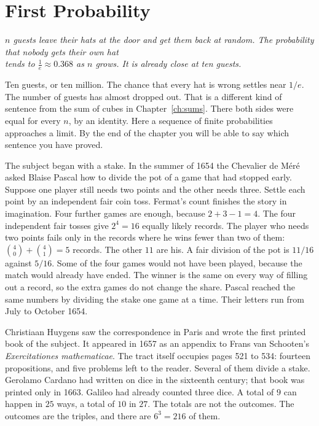 \chapter{First Probability}\label{ch:probability}

\begin{center}\itshape
$n$ guests leave their hats at the door and get them back at random. The probability that nobody gets their own hat\\
tends to $\frac1e\approx0.368$ as $n$ grows. It is already close at ten guests.
\end{center}

Ten guests, or ten million. The chance that every hat is wrong settles near $1/e$. The number of guests has almost dropped out. That is a different kind of sentence from the sum of cubes in Chapter~\ref{ch:sums}. There both sides were equal for every $n$, by an identity. Here a sequence of finite probabilities approaches a limit. By the end of the chapter you will be able to say which sentence you have proved.

The subject began with a stake. In the summer of 1654 the Chevalier de M\'er\'e asked Blaise Pascal how to divide the pot of a game that had stopped early. Suppose one player still needs two points and the other needs three. Settle each point by an independent fair coin toss. Fermat's count finishes the story in imagination. Four further games are enough, because $2+3-1=4$. The four independent fair tosses give $2^4=16$ equally likely records. The player who needs two points fails only in the records where he wins fewer than two of them: $\binom40+\binom41=5$ records. The other $11$ are his. A fair division of the pot is $11/16$ against $5/16$. Some of the four games would not have been played, because the match would already have ended. The winner is the same on every way of filling out a record, so the extra games do not change the share. Pascal reached the same numbers by dividing the stake one game at a time. Their letters run from July to October 1654.


Christiaan Huygens saw the correspondence in Paris and wrote the first printed book of the subject. It appeared in 1657 as an appendix to Frans van Schooten's \emph{Exercitationes mathematicae}. The tract itself occupies pages 521 to 534: fourteen propositions, and five problems left to the reader. Several of them divide a stake. Gerolamo Cardano had written on dice in the sixteenth century; that book was printed only in 1663. Galileo had already counted three dice. A total of $9$ can happen in $25$ ways, a total of $10$ in $27$. The totals are not the outcomes. The outcomes are the triples, and there are $6^3=216$ of them.


